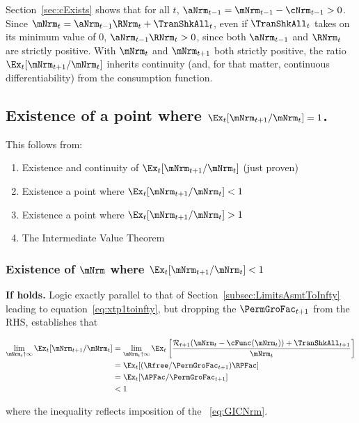 \documentclass[\econtexRoot/BufferStockTheory]{subfiles}
\begin{document}
Section~\ref{sec:cExists} shows that for all $t$, $\aNrm_{t-1} = {\mNrm}_{t-1} -  \cNrm_{t-1} > 0$.  Since ${\mNrm}_{t}= {\aNrm}_{t-1} \RNrm_{t} + \TranShkAll_{t}$, even if $\TranShkAll_{t}$ takes on its minimum value of 0, $\aNrm_{t-1} \RNrm_{t} > 0$, since both $\aNrm_{t-1}$ and $\RNrm_{t}$ are strictly positive.  With $\mNrm_{t}$ and $\mNrm_{t+1}$ both strictly positive, the ratio $\Ex_t [{\mNrm}_{t+1}/\mNrm_t]$ inherits continuity (and, for that matter, continuous differentiability) from the consumption function.

\subsection{Existence of a point where
  \texorpdfstring{$\Ex_t [{\mNrm}_{t+1}/\mNrm_t]=1$}
  {Ex-t[mNrm-{t+1}/mNrm-{t}]=1}.}

This follows from:
\begin{enumerate}
\item Existence and continuity of $\Ex_t [{\mNrm}_{t+1}/\mNrm_t]$ (just proven)
  \item Existence a point where $\Ex_t [{\mNrm}_{t+1}/\mNrm_t] < 1$
  \item Existence a point where $\Ex_t [{\mNrm}_{t+1}/\mNrm_t] > 1$
    \item The Intermediate Value Theorem
    \end{enumerate}

\subsubsection{Existence of \texorpdfstring{$\mNrm$}{m} where \texorpdfstring{$\Ex_t [{\mNrm}_{t+1}/\mNrm_t] < 1$}{E[m{t+1}/m{t}}}
    
\textbf{If {\RIC} holds.}  Logic exactly parallel to that of Section~\ref{subsec:LimitsAsmtToInfty} leading to equation~\eqref{eq:xtp1toinfty}, but dropping the $\PermGroFac_{t+1}$ from the RHS, establishes that
\begin{samepage}
\begin{equation}\begin{gathered}\begin{aligned}
  \lim_{\mNrm_{t} \uparrow \infty} \Ex_{t}[{\mNrm}_{t+1}/\mNrm_{t}]  & =   
                                                                       \lim_{\mNrm_{t} \uparrow \infty} 
                                                                       \Ex_{t}\left[\frac{{\mathcal{\mathcal{R}}}_{t+1}(\mNrm_{t}-\cFunc(\mNrm_{t}))+{\TranShkAll}_{t+1}}{\mNrm_{t}}\right] \notag 
  \\  & = \Ex_{t}[(\Rfree/{\PermGroFac}_{t+1})\RPFac]  \notag
  \\  & = \Ex_{t}[{\APFac}/{\PermGroFac}_{t+1}]  \label{eq:emgro}
  \\  & < 1 \notag
\end{aligned}\end{gathered}\end{equation}
\end{samepage}
where the inequality reflects imposition of the \GICNrm~\eqref{eq:GICNrm}.
\end{document}
